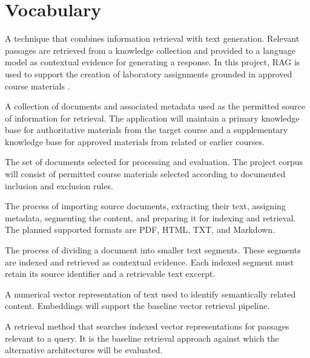 \documentclass[12pt,a4paper]{article}
\begin{document}
\section{Vocabulary}
\label{sec:vocabulary}

\begin{description}[style=nextline]

\item[Retrieval-Augmented Generation (RAG)]
A technique that combines information retrieval with text generation.
Relevant passages are retrieved from a knowledge collection and
provided to a language model as contextual evidence for generating
a response. In this project, RAG is used to support the creation of
laboratory assignments grounded in approved course materials
\cite{lewis2020rag}.

\item[Knowledge base]
A collection of documents and associated metadata used as the
permitted source of information for retrieval. The application will
maintain a primary knowledge base for authoritative materials from
the target course and a supplementary knowledge base for approved
materials from related or earlier courses.

\item[Corpus]
The set of documents selected for processing and evaluation.
The project corpus will consist of permitted course materials
selected according to documented inclusion and exclusion rules.

\item[Document ingestion]
The process of importing source documents, extracting their text,
assigning metadata, segmenting the content, and preparing it for
indexing and retrieval. The planned supported formats are PDF,
HTML, TXT, and Markdown.

\item[Chunking]
The process of dividing a document into smaller text segments.
These segments are indexed and retrieved as contextual evidence.
Each indexed segment must retain its source identifier and a
retrievable text excerpt.

\item[Embedding]
A numerical vector representation of text used to identify
semantically related content. Embeddings will support the baseline
vector retrieval pipeline.

\item[Vector retrieval]
A retrieval method that searches indexed vector representations
for passages relevant to a query. It is the baseline retrieval
approach against which the alternative architectures will be
evaluated.


\end{description}
\end{document}
